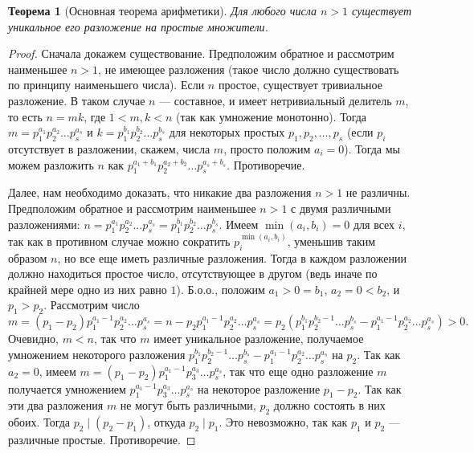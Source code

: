 \documentclass[12pt,notitlepage]{article}
\theoremstyle{plain}
\newtheorem{thm}{Теорема}[section]
\theoremstyle{definition}
\theoremstyle{plain}
\newcommand{\1}{\mathbf{1}}
\newcommand{\0}{\mathbf{0}}
\newcommand{\dvd}{\mathop{\mid}}
\begin{document}
\begin{thm}[Основная теорема арифметики]\label{L4:t14}
	Для любого числа $n > 1$ существует уникальное его разложение на простые множители.
\end{thm}
\begin{proof}
	Сначала докажем существование. Предположим обратное и рассмотрим наименьшее $n > 1$, не имеющее разложения (такое число должно существовать по принципу наименьшего числа). Если $n$ простое, существует тривиальное разложение. В таком случае $n$ --- составное, и имеет нетривиальный делитель $m$, то есть $n = m k$, где $1 < m, k < n$ (так как умножение монотонно). Тогда $m = p_1^{a_1} p_2^{a_2} \ldots p_s^{a_s}$ и $k = p_1^{b_1} p_2^{b_2} \ldots p_s^{b_s}$ для некоторых простых $p_1, p_2, \ldots, p_s$ (если $p_i$ отсутствует в разложении, скажем, числа $m$, просто положим $a_i = 0$). Тогда мы можем разложить $n$ как $p_1^{a_1 + b_1} p_2^{a_2 + b_2} \ldots p_s^{a_s + b_s}$. Противоречие.
	
	Далее, нам необходимо доказать, что никакие два разложения $n > 1$ не различны. Предположим обратное и рассмотрим наименьшее $n > 1$ с двумя различными разложениями:  $n = p_1^{a_1} p_2^{a_2} \ldots p_s^{a_s} = p_1^{b_1} p_2^{b_2} \ldots p_s^{b_s}$. Имеем $\min(a_i, b_i) = 0$ для всех $i$, так как в противном случае можно сократить $p_i^{\min(a_i, b_i)}$, уменьшив таким образом $n$, но все еще иметь различные разложения. Тогда в каждом разложении должно находиться простое число, отсутствующее в другом (ведь иначе по крайней мере одно из них равно $1$). Б.о.о., положим $a_1 > 0 = b_1$, $a_2 = 0 < b_2$, и $p_1 > p_2$. Рассмотрим число
	$$m = (p_1 - p_2)p^{a_1 - 1}_1 p_2^{a_2} \ldots p_s^{a_s} = n - p_2 p^{a_1 - 1}_1 p_2^{a_2} \ldots p_s^{a_s} = p_2 (p^{b_1}_1 p_2^{b_2 - 1} \ldots p_s^{b_s} - p^{a_1 - 1}_1 p_2^{a_2} \ldots p_s^{a_s}) > 0.$$
	Очевидно, $m < n$, так что $m$ имеет уникальное разложение, получаемое умножением некоторого разложения $p^{b_1}_1 p_2^{b_2 - 1} \ldots p_s^{b_s} - p^{a_1 - 1}_1 p_2^{a_2} \ldots p_s^{a_s}$ на $p_2$. Так как $a_2 = 0$, имеем $m = (p_1 - p_2)p^{a_1 - 1}_1 p_3^{a_3} \ldots p_s^{a_s}$, так что еще одно разложение $m$ получается умножением $p^{a_1 - 1}_1 p_3^{a_3} \ldots p_s^{a_s}$ на некоторое разложение $p_1 - p_2$. Так как эти два разложения $m$ не могут быть различными, $p_2$ должно состоять в них обоих. Тогда $p_2 \dvd (p_2 - p_1)$, откуда $p_2 \dvd p_1$. Это невозможно, так как $p_1$ и $p_2$ --- различные простые. Противоречие.
\end{proof}
\end{document}
